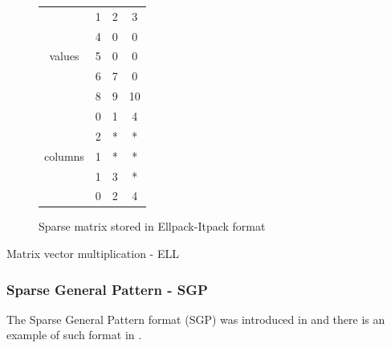 \begin{figure}
\centering
\begin{tabular}{c|ccc|}
	\cline{2-4}
	\multirow{5}{*}{values}  & 1 & 2 & 3  \\
	                         & 4 & 0 & 0  \\
	                         & 5 & 0 & 0  \\
	                         & 6 & 7 & 0  \\
	                         & 8 & 9 & 10 \\ \cline{2-4}
	\multirow{5}{*}{columns} & 0 & 1 & 4  \\
	                         & 2 & * & *  \\
	                         & 1 & * & *  \\
	                         & 1 & 3 & *  \\
	                         & 0 & 2 & 4  \\ \cline{2-4}
\end{tabular}
\caption{Sparse matrix stored in Ellpack-Itpack format \label{fig:methods:ell_ex}}
\end{figure}

\begin{algorithm}[h]
	\DontPrintSemicolon
	\caption{Matrix vector multiplication - ELL\label{fig:methods:ell_algo}}
\end{algorithm}

\subsubsection{Sparse General Pattern - SGP}
The Sparse General Pattern format (SGP) was introduced in \cite{Petit1991} and there is an example of such format in \cite{PetiE1996}.

